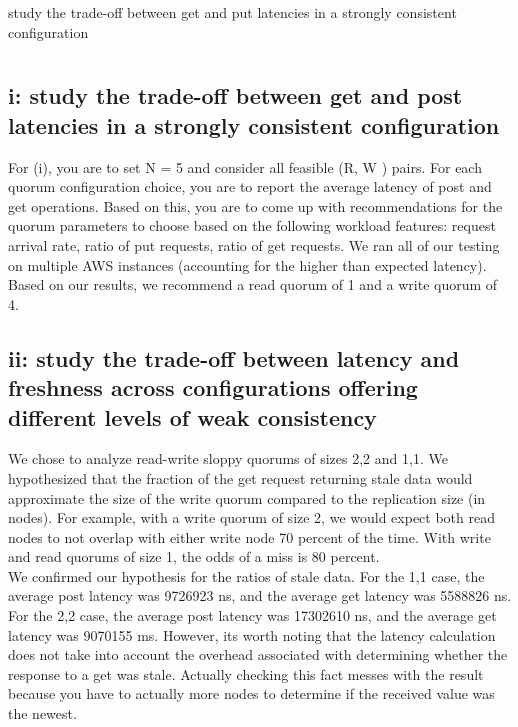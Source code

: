 \documentclass[12pt,letter]{article}
\begin{document}
study the trade-off between get and put latencies in a strongly consistent configuration

\onehalfspacing
\section*{}
\subsection*{i: study the trade-off between get and post latencies in a strongly consistent configuration}
For (i), you are to set N = 5 and consider all feasible (R, W ) pairs. For each quorum configuration choice, you are to report the average latency of post and get operations. Based on this, you are to come up with recommendations for the quorum parameters to choose based on the following workload features: request arrival rate, ratio of put requests, ratio of get requests.
We ran all of our testing on multiple AWS instances (accounting for the higher than expected latency). Based on our results, we recommend a read quorum of 1 and a write quorum of 4.\\

\subsection*{ii: study the trade-off between latency and freshness across configurations offering different levels of weak consistency}
We chose to analyze read-write sloppy quorums of sizes 2,2 and 1,1. We hypothesized that the fraction of the get request returning stale data would approximate the size of the write quorum compared to the replication size (in nodes). For example, with a write quorum of size 2, we would expect both read nodes to not overlap with either write node 70 percent of the time. With write and read quorums of size 1, the odds of a miss is 80 percent.\\

\onehalfspacing
We confirmed our hypothesis for the ratios of stale data. For the 1,1 case, the average post latency was 9726923 ns, and the average get latency was 5588826 ns. For the 2,2 case, the average post latency was 17302610 ns, and the average get latency was 9070155 ms. However, its worth noting that the latency calculation does not take into account the overhead associated with determining whether the response to a get was stale. Actually checking this fact messes with the result because you have to actually more nodes to determine if the received value was the newest. 
\end{document}
